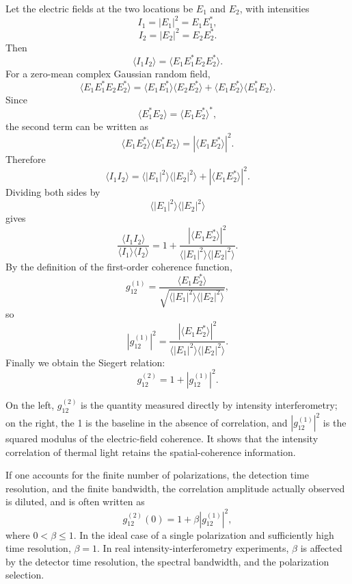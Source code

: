 Let the electric fields at the two locations be \(E_1\) and \(E_2\), with intensities
\[
  I_1=|E_1|^2=E_1E_1^\ast,
\]
\[
  I_2=|E_2|^2=E_2E_2^\ast.
\]
Then
\[
  \langle I_1 I_2\rangle
  =
  \langle E_1E_1^\ast E_2E_2^\ast\rangle.
\]
For a zero-mean complex Gaussian random field,
\[
  \langle E_1E_1^\ast E_2E_2^\ast\rangle
  =
  \langle E_1E_1^\ast\rangle
  \langle E_2E_2^\ast\rangle
  +
  \langle E_1E_2^\ast\rangle
  \langle E_1^\ast E_2\rangle.
\]
Since
\[
  \langle E_1^\ast E_2\rangle
  =
  \langle E_1E_2^\ast\rangle^\ast,
\]
the second term can be written as
\[
  \langle E_1E_2^\ast\rangle
  \langle E_1^\ast E_2\rangle
  =
  \left|
  \langle E_1E_2^\ast\rangle
  \right|^2.
\]
Therefore
\[
  \langle I_1 I_2\rangle
  =
  \langle |E_1|^2\rangle
  \langle |E_2|^2\rangle
  +
  \left|
  \langle E_1E_2^\ast\rangle
  \right|^2.
\]
Dividing both sides by
\[
  \langle |E_1|^2\rangle
  \langle |E_2|^2\rangle
\]
gives
\[
  \frac{
    \langle I_1 I_2\rangle
  }{
    \langle I_1\rangle
    \langle I_2\rangle
  }
  =
  1+
  \frac{
    \left|
    \langle E_1E_2^\ast\rangle
    \right|^2
  }{
    \langle |E_1|^2\rangle
    \langle |E_2|^2\rangle
  }.
\]
By the definition of the first-order coherence function,
\[
  g^{(1)}_{12}
  =
  \frac{
    \langle E_1E_2^\ast\rangle
  }{
    \sqrt{
      \langle |E_1|^2\rangle
      \langle |E_2|^2\rangle
    }
  },
\]
so
\[
  \left|g^{(1)}_{12}\right|^2
  =
  \frac{
    \left|
    \langle E_1E_2^\ast\rangle
    \right|^2
  }{
    \langle |E_1|^2\rangle
    \langle |E_2|^2\rangle
  }.
\]
Finally we obtain the Siegert relation:
\[
  g^{(2)}_{12}
  =
  1+
  \left|g^{(1)}_{12}\right|^2.
\]
\begin{formulaexplain}
On the left, \(g^{(2)}_{12}\) is the quantity measured directly by intensity interferometry; on the right, the 1 is the baseline in the absence of correlation, and \(|g^{(1)}_{12}|^2\) is the squared modulus of the electric-field coherence. It shows that the intensity correlation of thermal light retains the spatial-coherence information.
\end{formulaexplain}
If one accounts for the finite number of polarizations, the detection time resolution, and the finite bandwidth, the correlation amplitude actually observed is diluted, and is often written as
\[
  g^{(2)}_{12}(0)
  =
  1+\beta \left|g^{(1)}_{12}\right|^2,
\]
where \(0<\beta\leq 1\). In the ideal case of a single polarization and sufficiently high time resolution, \(\beta=1\). In real intensity-interferometry experiments, \(\beta\) is affected by the detector time resolution, the spectral bandwidth, and the polarization selection.

